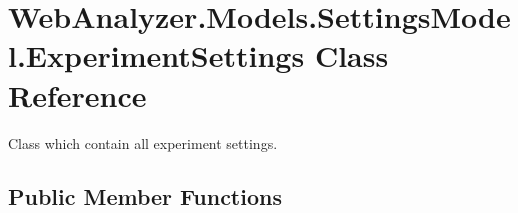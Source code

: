 \hypertarget{class_web_analyzer_1_1_models_1_1_settings_model_1_1_experiment_settings}{}\section{Web\+Analyzer.\+Models.\+Settings\+Model.\+Experiment\+Settings Class Reference}
\label{class_web_analyzer_1_1_models_1_1_settings_model_1_1_experiment_settings}


Class which contain all experiment settings.  


\subsection*{Public Member Functions}
